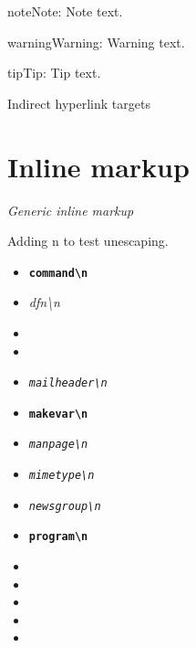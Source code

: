 \documentclass[letterpaper,10pt,english]{sphinxmanual}
\begin{document}
\begin{notice}{note}{Note:}
Note text.
\end{notice}

\begin{notice}{warning}{Warning:}
Warning text.
\end{notice}
\label{markup:some-label}
\begin{notice}{tip}{Tip:}
Tip text.
\end{notice}

Indirect hyperlink targets


\section{Inline markup}
\label{markup:inline-markup}\label{markup:other-label}\label{markup:some-label}
\emph{Generic inline markup}

Adding n to test unescaping.
\begin{itemize}
\item {} 
\textbf{\texttt{command\textbackslash{}n}}

\item {} 
\emph{dfn\textbackslash{}n}

\item {} 

\item {} 

\item {} 
\emph{\texttt{mailheader\textbackslash{}n}}

\item {} 
\textbf{\texttt{makevar\textbackslash{}n}}

\item {} 
\emph{\texttt{manpage\textbackslash{}n}}

\item {} 
\emph{\texttt{mimetype\textbackslash{}n}}

\item {} 
\emph{\texttt{newsgroup\textbackslash{}n}}

\item {} 
\textbf{\texttt{program\textbackslash{}n}}

\item {} 

\item {} 

\item {} 

\item {} 

\item {} 

\end{itemize}
\end{document}
